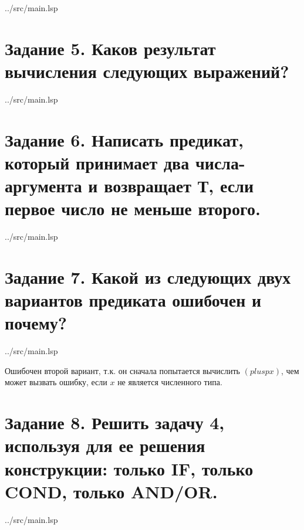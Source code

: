 \begin{lstinputlisting}[
	caption={Задание 4},
	label={lst:t4},
	style={lsp},
	linerange={19-20},
	]{../src/main.lsp}
\end{lstinputlisting}

\section*{Задание 5. Каков результат вычисления следующих выражений?}

\begin{lstinputlisting}[
	caption={Задание 5},
	label={lst:t5},
	style={lsp},
	linerange={22-27},
	]{../src/main.lsp}
\end{lstinputlisting}

\section*{Задание 6. Написать предикат, который принимает два числа-аргумента и возвращает Т, если первое число не меньше второго.}

\begin{lstinputlisting}[
	caption={Задание 6},
	label={lst:t6},
	style={lsp},
	linerange={29-30},
	]{../src/main.lsp}
\end{lstinputlisting}

\section*{Задание 7. Какой из следующих двух вариантов предиката ошибочен и почему?}

\begin{lstinputlisting}[
	caption={Задание 7},
	label={lst:t7},
	style={lsp},
	linerange={32-36},
	]{../src/main.lsp}
\end{lstinputlisting}

Ошибочен второй вариант, т.к. он сначала попытается вычислить $(plusp x)$, чем может вызвать ошибку, если $x$ не является численного типа.

\section*{Задание 8. Решить задачу 4, используя для ее решения конструкции: только IF, только COND, только AND/OR.}

\begin{lstinputlisting}[
	caption={Задание 8, IF},
	label={lst:t8},
	style={lsp},
	linerange={38-43},
	]{../src/main.lsp}
\end{lstinputlisting}

